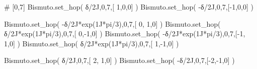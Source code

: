 \documentclass[
  letterpaper,
  DIV=11,
  numbers=noendperiod]{scrreprt}
\newenvironment{Shaded}{\begin{snugshade}}{\end{snugshade}}
\newcommand{\CommentTok}[1]{\textcolor[rgb]{0.37,0.37,0.37}{#1}}
\newcommand{\DecValTok}[1]{\textcolor[rgb]{0.68,0.00,0.00}{#1}}
\newcommand{\NormalTok}[1]{\textcolor[rgb]{0.00,0.23,0.31}{#1}}
\newcommand{\OperatorTok}[1]{\textcolor[rgb]{0.37,0.37,0.37}{#1}}
\newcommand{\OtherTok}[1]{\textcolor[rgb]{0.00,0.23,0.31}{#1}}
\begin{document}
\begin{Shaded}
\begin{Highlighting}[]
\CommentTok{\# [0,7]}
\NormalTok{Bismuto.set\_hop(  δ}\OperatorTok{/}\OtherTok{2J}\NormalTok{,}\DecValTok{0}\NormalTok{,}\DecValTok{7}\NormalTok{,[ }\DecValTok{1}\NormalTok{,}\DecValTok{0}\NormalTok{,}\DecValTok{0}\NormalTok{] ) }
\NormalTok{Bismuto.set\_hop( }\OperatorTok{{-}}\NormalTok{δ}\OperatorTok{/}\OtherTok{2J}\NormalTok{,}\DecValTok{0}\NormalTok{,}\DecValTok{7}\NormalTok{,[}\OperatorTok{{-}}\DecValTok{1}\NormalTok{,}\DecValTok{0}\NormalTok{,}\DecValTok{0}\NormalTok{] )}

\NormalTok{Bismuto.set\_hop( }\OperatorTok{{-}}\NormalTok{δ}\OperatorTok{/}\OtherTok{2J}\OperatorTok{*}\NormalTok{exp(}\OtherTok{1J}\OperatorTok{*}\NormalTok{pi}\OperatorTok{/}\DecValTok{3}\NormalTok{),}\DecValTok{0}\NormalTok{,}\DecValTok{7}\NormalTok{,[ }\DecValTok{0}\NormalTok{, }\DecValTok{1}\NormalTok{,}\DecValTok{0}\NormalTok{] ) }
\NormalTok{Bismuto.set\_hop(  δ}\OperatorTok{/}\OtherTok{2J}\OperatorTok{*}\NormalTok{exp(}\OtherTok{1J}\OperatorTok{*}\NormalTok{pi}\OperatorTok{/}\DecValTok{3}\NormalTok{),}\DecValTok{0}\NormalTok{,}\DecValTok{7}\NormalTok{,[ }\DecValTok{0}\NormalTok{,}\OperatorTok{{-}}\DecValTok{1}\NormalTok{,}\DecValTok{0}\NormalTok{] ) }
\NormalTok{Bismuto.set\_hop( }\OperatorTok{{-}}\NormalTok{δ}\OperatorTok{/}\OtherTok{2J}\OperatorTok{*}\NormalTok{exp(}\OtherTok{1J}\OperatorTok{*}\NormalTok{pi}\OperatorTok{/}\DecValTok{3}\NormalTok{),}\DecValTok{0}\NormalTok{,}\DecValTok{7}\NormalTok{,[}\OperatorTok{{-}}\DecValTok{1}\NormalTok{, }\DecValTok{1}\NormalTok{,}\DecValTok{0}\NormalTok{] ) }
\NormalTok{Bismuto.set\_hop(  δ}\OperatorTok{/}\OtherTok{2J}\OperatorTok{*}\NormalTok{exp(}\OtherTok{1J}\OperatorTok{*}\NormalTok{pi}\OperatorTok{/}\DecValTok{3}\NormalTok{),}\DecValTok{0}\NormalTok{,}\DecValTok{7}\NormalTok{,[ }\DecValTok{1}\NormalTok{,}\OperatorTok{{-}}\DecValTok{1}\NormalTok{,}\DecValTok{0}\NormalTok{] ) }

\NormalTok{Bismuto.set\_hop(  δ}\OperatorTok{/}\OtherTok{2J}\NormalTok{,}\DecValTok{0}\NormalTok{,}\DecValTok{7}\NormalTok{,[ }\DecValTok{2}\NormalTok{, }\DecValTok{1}\NormalTok{,}\DecValTok{0}\NormalTok{] ) }
\NormalTok{Bismuto.set\_hop( }\OperatorTok{{-}}\NormalTok{δ}\OperatorTok{/}\OtherTok{2J}\NormalTok{,}\DecValTok{0}\NormalTok{,}\DecValTok{7}\NormalTok{,[}\OperatorTok{{-}}\DecValTok{2}\NormalTok{,}\OperatorTok{{-}}\DecValTok{1}\NormalTok{,}\DecValTok{0}\NormalTok{] )}


\end{Highlighting}
\end{Shaded}
\end{document}
